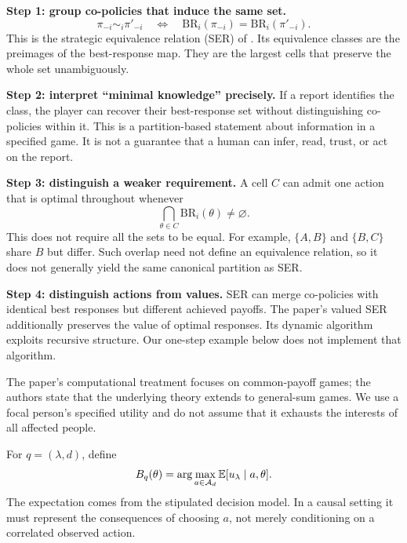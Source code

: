 \documentclass[11pt,letterpaper]{article}
\begin{document}
\textbf{Step 1: group co-policies that induce the same set.}
\begin{equation}
 \pi_{-i}\sim_i\pi'_{-i}\quad\Longleftrightarrow\quad
 \mathrm{BR}_i(\pi_{-i})=\mathrm{BR}_i(\pi'_{-i}).
\end{equation}
This is the strategic equivalence relation (SER) of \citet[Definition 4.3, PDF p. 4]{lauffer2023knowledge}. Its equivalence classes are the preimages of the best-response map. They are the largest cells that preserve the whole set unambiguously.

\textbf{Step 2: interpret ``minimal knowledge'' precisely.} If a report identifies the class, the player can recover their best-response set without distinguishing co-policies within it. This is a partition-based statement about information in a specified game. It is not a guarantee that a human can infer, read, trust, or act on the report.

\textbf{Step 3: distinguish a weaker requirement.} A cell $C$ can admit one action that is optimal throughout whenever
\begin{equation}
 \bigcap_{\theta\in C}\mathrm{BR}_i(\theta)\neq\varnothing.
\end{equation}
This does not require all the sets to be equal. For example, $\{A,B\}$ and $\{B,C\}$ share $B$ but differ. Such overlap need not define an equivalence relation, so it does not generally yield the same canonical partition as SER.

\textbf{Step 4: distinguish actions from values.} SER can merge co-policies with identical best responses but different achieved payoffs. The paper's valued SER additionally preserves the value of optimal responses. Its dynamic algorithm exploits recursive structure. Our one-step example below does not implement that algorithm.

The paper's computational treatment focuses on common-payoff games; the authors state that the underlying theory extends to general-sum games. We use a focal person's specified utility and do not assume that it exhausts the interests of all affected people.

For $q=(\lambda,d)$, define
\begin{equation}
 B_q(\theta)=\arg\max_{a\in\mathcal A_d}
 \mathbb{E}[u_\lambda\mid a,\theta].
\end{equation}
The expectation comes from the stipulated decision model. In a causal setting it must represent the consequences of choosing $a$, not merely conditioning on a correlated observed action.
\end{document}
